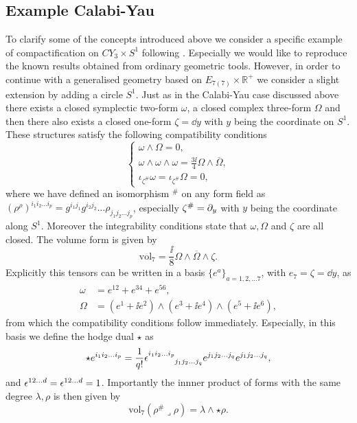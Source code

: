 \subsection{Example Calabi-Yau}
To clarify some of the concepts introduced above we consider a specific example of compactification on $CY_3\times S^1$ following \cite{Ashmore:2015joa}. Especially we would like to reproduce the known results obtained from ordinary geometric tools. However, in order to continue with a generalised geometry based on $E_{7(7)}\times \mathbb{R}^+$ we consider a slight extension by adding a circle $S^1$. Just as in the Calabi-Yau case discussed above there exists a closed symplectic two-form $\omega$, a closed complex three-form $\Omega$ and then there also exists a closed one-form $\zeta=\dd y$ with $y$ being the coordinate on $S^1$. These structures satisfy the following compatibility conditions 
\begin{equation}
    \begin{cases}
        \omega\wedge\Omega = 0,\\
        \omega\wedge\omega\wedge\omega = \frac{3\ii}{4}\Omega\wedge\overbar{\Omega},\\
        \iota_{\zeta^{\#}}\omega = \iota_{\zeta^{\#}}\Omega = 0,
    \end{cases}
\end{equation}
where we have defined an isomorphism $^{\#}$ on any form field as $(\rho^{\rho})^{i_1i_2\ldots i_p}=g^{i_1j_1}g^{i_2j_2}\ldots\rho_{j_1j_2\ldots j_p}$, especially $\zeta^{\#}=\partial_y$ with $y$ being the coordinate along $S^1$. Moreover the integrability conditions state that $\omega,\Omega$ and $\zeta$ are all closed. The volume form is given by 
\begin{equation}
    \text{vol}_7 = \frac{\ii}{8}\Omega\wedge\overbar{\Omega}\wedge \zeta. 
\end{equation}
Explicitly this tensors can be written in a basis $\{e^a\}_{a=1,2,\ldots 7}$, with $e_7=\zeta=\dd y$, as 
\begin{equation}
    \begin{aligned}\label{eq:Frame}
        \omega &= e^{12}+e^{34}+e^{56},\\
        \Omega &= (e^1+\ii e^{2})\wedge(e^3+\ii e^{4})\wedge(e^5+\ii e^{6}),
    \end{aligned}
\end{equation}
from which the compatibility conditions follow immediately. Especially, in this basis we define the hodge dual $\star$ as 
\begin{equation}
    \star e^{i_1i_2\ldots i_p} = \frac{1}{q!}\tensor{\epsilon}{^{i_1i_2\ldots i_p}_{j_1j_2\ldots j_q}}e^{j_1j_2\ldots j_q}e^{j_1j_2\ldots j_q},
\end{equation}
and $\tensor{\epsilon}{^{12\ldots d}}=\tensor{\epsilon}{^{12\ldots d}}=1$. Importantly the innner product of forms with the same degree $\lambda,\rho$ is then given by
\begin{equation}
    \text{vol}_7(\rho^{\#}\lrcorner \rho) = \lambda\wedge\star\rho.
\end{equation}

